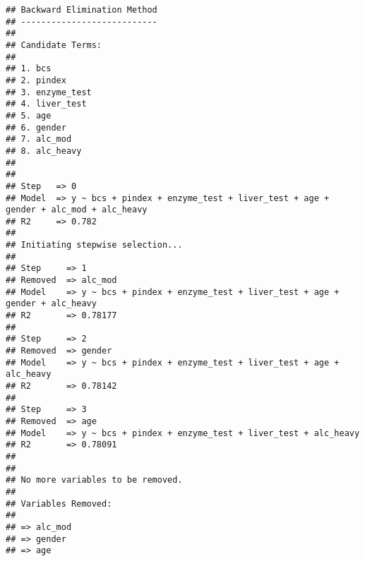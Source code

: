 \documentclass[
]{article}
\begin{document}
\begin{verbatim}
## Backward Elimination Method 
## ---------------------------
## 
## Candidate Terms: 
## 
## 1. bcs 
## 2. pindex 
## 3. enzyme_test 
## 4. liver_test 
## 5. age 
## 6. gender 
## 7. alc_mod 
## 8. alc_heavy 
## 
## 
## Step   => 0 
## Model  => y ~ bcs + pindex + enzyme_test + liver_test + age + gender + alc_mod + alc_heavy 
## R2     => 0.782 
## 
## Initiating stepwise selection... 
## 
## Step     => 1 
## Removed  => alc_mod 
## Model    => y ~ bcs + pindex + enzyme_test + liver_test + age + gender + alc_heavy 
## R2       => 0.78177 
## 
## Step     => 2 
## Removed  => gender 
## Model    => y ~ bcs + pindex + enzyme_test + liver_test + age + alc_heavy 
## R2       => 0.78142 
## 
## Step     => 3 
## Removed  => age 
## Model    => y ~ bcs + pindex + enzyme_test + liver_test + alc_heavy 
## R2       => 0.78091 
## 
## 
## No more variables to be removed.
## 
## Variables Removed: 
## 
## => alc_mod 
## => gender 
## => age
\end{verbatim}
\end{document}
